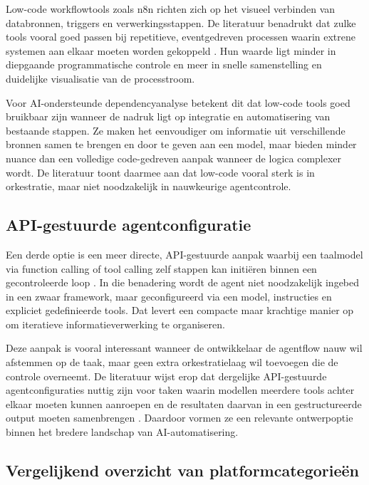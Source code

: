 Low-code workflowtools zoals n8n richten zich op het visueel verbinden van databronnen, triggers en verwerkingsstappen. De literatuur benadrukt dat zulke tools vooral goed passen bij repetitieve, eventgedreven processen waarin extrene systemen aan elkaar moeten worden gekoppeld \textcite{N8nDocs,N8nGuide,N8nWorkOS}. Hun waarde ligt minder in diepgaande programmatische controle en meer in snelle samenstelling en duidelijke visualisatie van de processtroom.

Voor AI-ondersteunde dependencyanalyse betekent dit dat low-code tools goed bruikbaar zijn wanneer de nadruk ligt op integratie en automatisering van bestaande stappen. Ze maken het eenvoudiger om informatie uit verschillende bronnen samen te brengen en door te geven aan een model, maar bieden minder nuance dan een volledige code-gedreven aanpak wanneer de logica complexer wordt. De literatuur toont daarmee aan dat low-code vooral sterk is in orkestratie, maar niet noodzakelijk in nauwkeurige agentcontrole.

\subsection{API-gestuurde agentconfiguratie}

Een derde optie is een meer directe, API-gestuurde aanpak waarbij een taalmodel via function calling of tool calling zelf stappen kan initiëren binnen een gecontroleerde loop \textcite{OpenAIFunctionCalling,OpenAIToolsDocs,OpenAIAgentsDocs}. In die benadering wordt de agent niet noodzakelijk ingebed in een zwaar framework, maar geconfigureerd via een model, instructies en expliciet gedefinieerde tools. Dat levert een compacte maar krachtige manier op om iteratieve informatieverwerking te organiseren.

Deze aanpak is vooral interessant wanneer de ontwikkelaar de agentflow nauw wil afstemmen op de taak, maar geen extra orkestratielaag wil toevoegen die de controle overneemt. De literatuur wijst erop dat dergelijke API-gestuurde agentconfiguraties nuttig zijn voor taken waarin modellen meerdere tools achter elkaar moeten kunnen aanroepen en de resultaten daarvan in een gestructureerde output moeten samenbrengen \textcite{OpenAIFunctionCalling,OpenAIToolsDocs}. Daardoor vormen ze een relevante ontwerpoptie binnen het bredere landschap van AI-automatisering.

\subsection{Vergelijkend overzicht van platformcategorieën}

